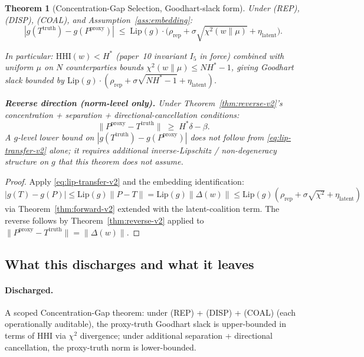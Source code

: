 \documentclass{article}
\newtheorem{theorem}{Theorem}
\newcommand{\HHI}{\mathrm{HHI}}
\newcommand{\Pproxy}{P^{\mathrm{proxy}}}
\newcommand{\Ttruth}{T^{\mathrm{truth}}}
\newcommand{\Lip}{\mathrm{Lip}}
\newcommand{\chisq}{\chi^2}
\begin{document}
\begin{theorem}[Concentration-Gap Selection, Goodhart-slack form]
\label{thm:concgap-v2}
Under (REP), (DISP), (COAL), and Assumption~\ref{ass:embedding}:
\begin{equation}
\label{eq:concgap-bound-v2}
  |g(\Ttruth) - g(\Pproxy)| \;\leq\; \Lip(g) \cdot
  \big(\rho_\mathrm{rep} + \sigma \sqrt{\chisq(w \|\mu)} +
  \eta_\mathrm{latent}\big).
\end{equation}

In particular: $\HHI(w) < H^*$ (paper~10 invariant $I_5$ in force)
combined with uniform $\mu$ on $N$ counterparties bounds
$\chisq(w \|\mu) \leq N H^* - 1$, giving Goodhart slack bounded by
$\Lip(g) \cdot (\rho_\mathrm{rep} + \sigma \sqrt{N H^* - 1} +
\eta_\mathrm{latent})$.

\textbf{Reverse direction (norm-level only).}  Under
Theorem~\ref{thm:reverse-v2}'s concentration + separation +
directional-cancellation conditions:
\begin{equation}
  \|\Pproxy - \Ttruth\| \;\geq\; H^* \delta - \beta.
\end{equation}
A $g$-level lower bound on $|g(\Ttruth) - g(\Pproxy)|$ does
\emph{not} follow from \eqref{eq:lip-transfer-v2} alone; it
requires additional inverse-Lipschitz / non-degeneracy structure
on $g$ that this theorem does not assume.
\end{theorem}

\begin{proof}
Apply \eqref{eq:lip-transfer-v2} and the embedding
identification: $|g(T) - g(P)| \leq \Lip(g) \|P - T\| =
\Lip(g) \|\Delta(w)\| \leq \Lip(g) (\rho_\mathrm{rep} + \sigma
\sqrt{\chisq} + \eta_\mathrm{latent})$ via
Theorem~\ref{thm:forward-v2} extended with the latent-coalition
term.  The reverse follows by Theorem~\ref{thm:reverse-v2} applied
to $\|\Pproxy - \Ttruth\| = \|\Delta(w)\|$.
\end{proof}

\subsection{What this discharges and what it leaves}

\paragraph{Discharged.} A scoped Concentration-Gap theorem:
under (REP) + (DISP) + (COAL) (each operationally auditable), the
proxy-truth Goodhart slack is upper-bounded in terms of $\HHI$ via
$\chi^2$ divergence; under additional separation + directional
cancellation, the proxy-truth norm is lower-bounded.
\end{document}
